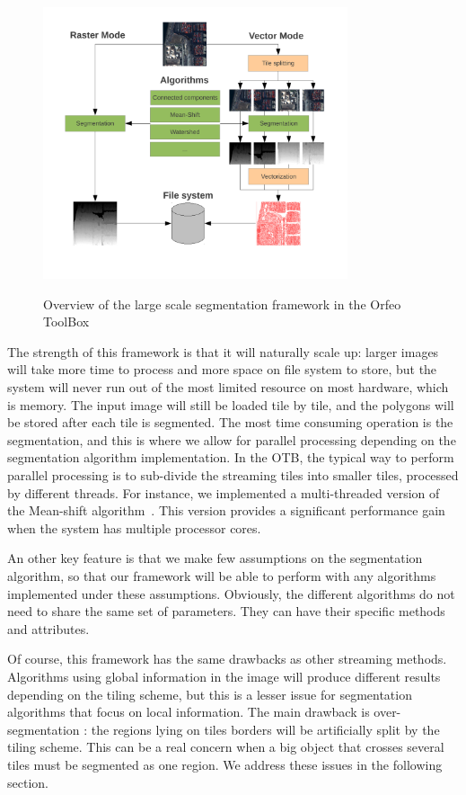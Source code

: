 \documentclass{josis}
\begin{document}
\begin{figure}[!htb]
\centering
\includegraphics[width=0.8\textwidth]{Pictures/schema_ogrs}\label{fig:overview}
\caption{Overview of the large scale segmentation framework in the Orfeo ToolBox}\label{fig:framework}
\end{figure} 

The strength of this framework is that it will naturally scale up:
larger images will take more time to process and more space on file
system to store, but the system will never run out of the most limited
resource on most hardware, which is memory. The input image will still
be loaded tile by tile, and the polygons will be stored after each
tile is segmented. The most time consuming operation is the
segmentation, and this is where we allow for parallel processing
depending on the segmentation algorithm implementation. In the OTB,
the typical way to perform parallel processing is to sub-divide the
streaming tiles into smaller tiles, processed by different
threads. For instance, we implemented a multi-threaded version of the
Mean-shift algorithm~\cite{comaniciu2002mean}. This version provides a
significant performance gain when the system has multiple processor
cores.

An other key feature is that we make few assumptions on the segmentation
algorithm, so that our framework will be able to perform with any algorithms
implemented under these assumptions. Obviously, the different algorithms do not
need to share the same set of parameters. They can have their specific methods
and attributes.

Of course, this framework has the same drawbacks as other streaming
methods. Algorithms using global information in the image will
produce different results depending on the tiling scheme, but this is
a lesser issue for segmentation algorithms that focus on local
information. The main drawback is over-segmentation : the regions
lying on tiles borders will be artificially split by the tiling
scheme. This can be a real concern when a big object that crosses
several tiles must be segmented as one region. We address these
issues in the following section.
\end{document}
